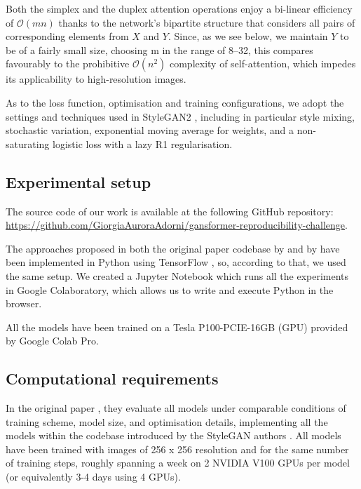 \documentclass{article}
\begin{document}
	Both the simplex and the duplex attention operations enjoy a bi-linear efficiency of 
	$\mathcal{O}(mn)$ thanks to the network’s bipartite structure that considers all pairs of 
	corresponding elements from $X$ and $Y$. Since, as we see below, we maintain $Y$ to be of a fairly 
	small size, choosing m in the range of 8–32, this compares favourably to the prohibitive 	
	$\mathcal{O}(n^2)$  complexity of self-attention, which impedes its applicability to high-resolution 
	images.
	
	As to the loss function, optimisation and training configurations, we adopt the settings and 
	techniques used in StyleGAN2 \cite{karras2020analyzing}, including in particular style mixing, 
	stochastic variation, exponential moving average for weights, and a non-saturating logistic loss with 
	a lazy R1 regularisation.
	
	\subsection{Experimental setup}	
	The source code of our work is available at the following GitHub repository: 
	\url{https://github.com/GiorgiaAuroraAdorni/gansformer-reproducibility-challenge}.
	
	The approaches proposed in both the original paper codebase by \citet{karras2020analyzing} and 
	by \citet{hudson2021generative} have been implemented in Python using TensorFlow 
	\cite{tensorflow2015-whitepaper}, so, according to that, we used the same setup.
	We created a Jupyter Notebook which runs all the experiments in Google Colaboratory, which 
	allows us to write and execute Python in the browser. 
	
	All the models have been trained on a Tesla P100-PCIE-16GB (GPU) provided by Google 
	Colab Pro.
	
	\subsection{Computational requirements}\label{sec:comput_req}
	
	In the original paper \cite{hudson2021generative}, they evaluate all models under comparable 
	conditions of training scheme, model size, and optimisation details, implementing all the models 
	within the codebase introduced by the StyleGAN authors \cite{karras2020analyzing}. 
	All models have been trained with images of 256 x 256 resolution and for the 
	same number of training steps, roughly spanning a week on 2 NVIDIA V100 GPUs per model (or 
	equivalently 3-4 days using 4 GPUs). 
	
\end{document}
